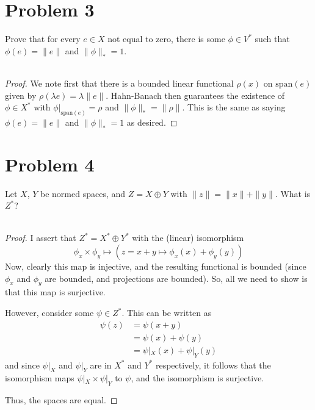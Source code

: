 \documentclass[fontsize=11pt]{scrartcl} %
\numberwithin{equation}{section} %
\numberwithin{figure}{section} %
\numberwithin{table}{section} %
\begin{document}
\section*{Problem 3}
Prove that for every $e\in X$ not equal to zero, there is some $\phi\in V^*$
such that $\phi(e) = \|e\|$ and $\|\phi\|_*=1$.
\\
\\
\begin{proof}
    We note first that there is a bounded linear functional $\rho(x)$ on
    $\text{span}(e)$ given by $\rho(\lambda e)=\lambda\|e\|$. 
    Hahn-Banach then guarantees the
    existence of $\phi\in X^*$ with $\phi|_{\text{span}(e)} = \rho$ and
    $\|\phi\|_*=\|\rho\|$. This is the same as saying $\phi(e) =\|e\|$ and
    $\|\phi\|_*=1$ as desired.
\end{proof}

\section*{Problem 4}
Let $X$, $Y$ be normed spaces, and $Z=X\oplus Y$ with $\|z\| = \|x\|+\|y\|$.
What is $Z^*$?
\\
\\
\begin{proof}
    I assert that $Z^* = X^*\oplus Y^*$ with the (linear) isomorphism
    \[
        \phi_x\times \phi_y \mapsto (z=x+y\mapsto \phi_x(x)+\phi_y(y))
    \]
    Now, clearly this map is injective, and the resulting functional is bounded
    (since $\phi_x$ and $\phi_y$ are bounded, and projections are bounded). So,
    all we need to show is that this map is surjective.

    However, consider some $\psi\in Z^*$. This can be written as
    \[
        \begin{aligned}
            \psi(z) &= \psi(x+y)\\
                    &= \psi(x) + \psi(y)\\
                    &= \psi|_X(x) + \psi|_Y(y)
        \end{aligned}
    \]
    and since $\psi|_X$ and $\psi|_Y$ are in $X^*$ and $Y^*$ respectively, it
    follows that the isomorphism maps $\psi|_X\times \psi|_Y$ to $\psi$, and the
    isomorphism is surjective.

    Thus, the spaces are equal.
\end{proof}
\end{document}
